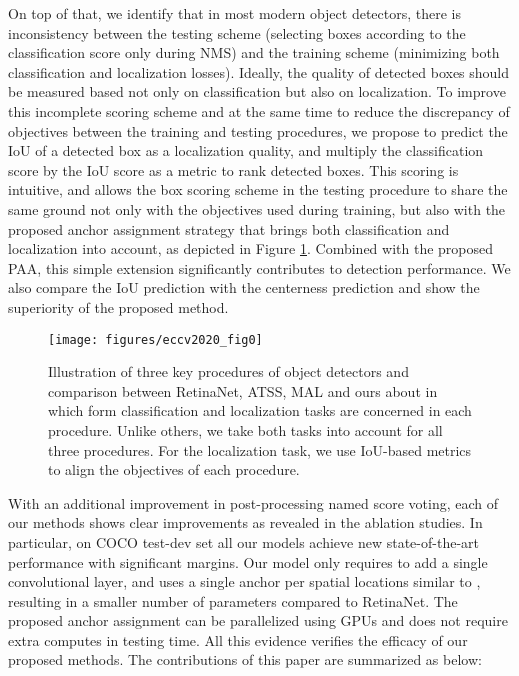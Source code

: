 \documentclass[runningheads]{llncs}
\begin{document}
On top of that, we identify that in most modern object detectors, there is inconsistency between the testing scheme (selecting boxes according to the classification score only during NMS) and the training scheme (minimizing both classification and localization losses). Ideally, the quality of detected boxes should be measured based not only on classification but also on localization. To improve this incomplete scoring scheme and at the same time to reduce the discrepancy of objectives between the training and testing procedures, we propose to predict the IoU of a detected box as a localization quality, and multiply the classification score by the IoU score as a metric to rank detected boxes. This scoring is intuitive, and allows the box scoring scheme in the testing procedure to share the same ground not only with the objectives used during training, but also with the proposed anchor assignment strategy that brings both classification and localization into account, as depicted in Figure \ref{fig0}.  Combined with the proposed PAA, this simple extension significantly contributes to detection performance. We also compare the IoU prediction with the centerness prediction\cite{fcos, atss} and show the superiority of the proposed method.
\begin{figure}[t]
	\begin{center}
		\texttt{[image: figures/eccv2020\_fig0]}
	\end{center}
	\caption{Illustration of three key procedures of object detectors and comparison between RetinaNet\cite{focal}, ATSS\cite{atss}, MAL\cite{mal} and ours about in which form classification and localization tasks are concerned in each procedure. Unlike others, we take both tasks into account for all three procedures. For the localization task, we use IoU-based metrics to align the objectives of each procedure.}
	\label{fig0}
\end{figure}

With an additional improvement in post-processing named score voting, each of our methods shows clear improvements as revealed in the ablation studies. In particular, on COCO test-dev set\cite{coco} all our models achieve new state-of-the-art performance with significant margins. Our model only requires to add a single convolutional layer, and uses a single anchor per spatial locations similar to \cite{atss}, resulting in a smaller number of parameters compared to RetinaNet\cite{focal}. The proposed anchor assignment can be parallelized using GPUs and does not require extra computes in testing time. All this evidence verifies the efficacy of our proposed methods. The contributions of this paper are summarized as below:
\end{document}
